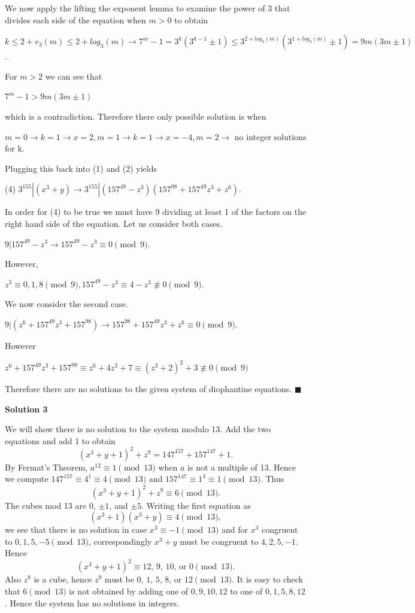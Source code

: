 \begin{enumerate}
 We now apply the lifting the exponent lemma to examine the power of 3 that divides each side of the equation when $m > 0$ to obtain

 $k \le 2+v_3(m) \le 2+log_3(m) \rightarrow 7^m-1 = 3^k(3^{k-1}\pm1)\le 3^{2+log_3(m)}(3^{1+log_3(m)}\pm1) = 9m(3m\pm1)$.

 For $m > 2$ we can see that 

 $7^m-1 > 9m(3m\pm1)$ 

 which is a contradiction. Therefore there only possible solution is when 

 $m = 0 \rightarrow k = 1 \rightarrow x = 2, m = 1 \rightarrow k = 1 \rightarrow x = -4, m = 2 \rightarrow$ no integer solutions for k.

 Plugging this back into (1) and (2) yields

 (4) $3^{155} | (x^3+y) \rightarrow 3^{155}| (157^{49}-z^3)(157^{98}+157^{49}z^3+z^6)$.

 In order for (4) to be true we must have 9 dividing at least 1 of the factors on the right hand side of the equation. Let us consider both cases.

 $9 | 157^{49}-z^3 \rightarrow 157^{49}-z^3 \equiv 0 \pmod{9}$.

 However,

 $z^3 \equiv 0, 1, 8\pmod{9}, 157^{49}-z^3 \equiv 4-z^3 \not\equiv 0 \pmod{9}$.

 We now consider the second case.

 $9 | (z^6+157^{49}z^3+157^{98}) \rightarrow 157^{98}+157^{49}z^3+z^6\equiv 0\pmod{9}$.

 However

 $z^6+157^{49}z^3+157^{98} \equiv z^6+4z^3+7 \equiv (z^3+2)^2+3 \not\equiv 0\pmod{9}$

 Therefore there are no solutions to the given system of diophantine equations. $\blacksquare$




\textbf{Solution 3}

We will show there is no solution to the system modulo 13. Add the two equations and add 1 to obtain
 \[(x^3 + y + 1)^2 + z^9 = 147^{157} + 157^{147} + 1.\]By Fermat's Theorem, $a^{12}\equiv 1\pmod{13}$ when $a$ is not a multiple of 13. Hence we compute $147^{157}\equiv 4^1\equiv 4\pmod{13}$ and $157^{147}\equiv 1^3\equiv 1\pmod{13}$. Thus
 \[(x^3 + y + 1)^2 + z^9\equiv 6\pmod{13}.\]The cubes mod 13 are $0$, $\pm 1$, and $\pm 5$. Writing the first equation as
 \[(x^3 + 1)(x^3 + y)\equiv 4\pmod{13},\]we see that there is no solution in case $x^3\equiv -1\pmod{13}$ and for $x^3$ congruent to $0, 1, 5, -5\pmod{13}$, correspondingly $x^3 + y$ must be congruent to $4, 2, 5, -1$. Hence
 \[(x^3 + y + 1)^2\equiv \text{12, 9, 10, or 0}\pmod{13}.\]Also $z^9$ is a cube, hence $z^9$ must be $\text{0, 1, 5, 8, or 12}\pmod{13}$. It is easy to check that $6\pmod{13}$ is not obtained by adding one of $0, 9, 10, 12$ to one of $0, 1, 5, 8, 12$. Hence the system has no solutions in integers.


\end{enumerate}
